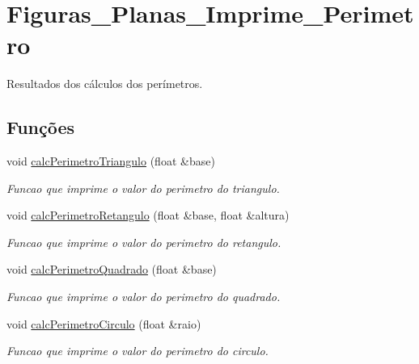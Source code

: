 \hypertarget{group__Figuras__Planas__Imprime__Perimetro}{}\section{Figuras\+\_\+\+Planas\+\_\+\+Imprime\+\_\+\+Perimetro}
\label{group__Figuras__Planas__Imprime__Perimetro}


Resultados dos cálculos dos perímetros.  


\subsection*{Funções}
\begin{DoxyCompactItemize}
\item 
void \hyperlink{group__Figuras__Planas__Imprime__Perimetro_gae49d939eed738e7168cd0efd8b40c09c}{calc\+Perimetro\+Triangulo} (float \&base)
\begin{DoxyCompactList}\small\item\em Funcao que imprime o valor do perimetro do triangulo. \end{DoxyCompactList}\item 
void \hyperlink{group__Figuras__Planas__Imprime__Perimetro_gab29565d71c21097aef26e73d36b9c8a6}{calc\+Perimetro\+Retangulo} (float \&base, float \&altura)
\begin{DoxyCompactList}\small\item\em Funcao que imprime o valor do perimetro do retangulo. \end{DoxyCompactList}\item 
void \hyperlink{group__Figuras__Planas__Imprime__Perimetro_gacaef8cc731e8f6564e033dadcbefa04f}{calc\+Perimetro\+Quadrado} (float \&base)
\begin{DoxyCompactList}\small\item\em Funcao que imprime o valor do perimetro do quadrado. \end{DoxyCompactList}\item 
void \hyperlink{group__Figuras__Planas__Imprime__Perimetro_ga6f116584d476bf2a78f83cb668e1f25b}{calc\+Perimetro\+Circulo} (float \&raio)
\begin{DoxyCompactList}\small\item\em Funcao que imprime o valor do perimetro do circulo. \end{DoxyCompactList}\end{DoxyCompactItemize}


